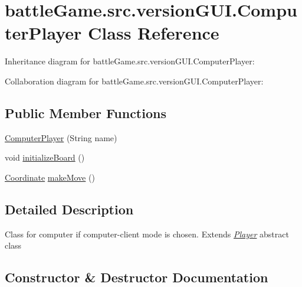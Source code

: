 \hypertarget{classbattleGame_1_1src_1_1versionGUI_1_1ComputerPlayer}{}\section{battle\+Game.\+src.\+version\+G\+U\+I.\+Computer\+Player Class Reference}
\label{classbattleGame_1_1src_1_1versionGUI_1_1ComputerPlayer}


Inheritance diagram for battle\+Game.\+src.\+version\+G\+U\+I.\+Computer\+Player\+:


Collaboration diagram for battle\+Game.\+src.\+version\+G\+U\+I.\+Computer\+Player\+:
\subsection*{Public Member Functions}
\begin{DoxyCompactItemize}
\item 
\hyperlink{classbattleGame_1_1src_1_1versionGUI_1_1ComputerPlayer_a9e3c1cdeba9113b3cf3dcb27ed9be0a4}{Computer\+Player} (String name)
\item 
void \hyperlink{classbattleGame_1_1src_1_1versionGUI_1_1ComputerPlayer_ae3521d354f8c0492b415c7b902d19e19}{initialize\+Board} ()
\item 
\hyperlink{classbattleGame_1_1src_1_1versionGUI_1_1Coordinate}{Coordinate} \hyperlink{classbattleGame_1_1src_1_1versionGUI_1_1ComputerPlayer_a7f5133e8159f65a2b5f9492197b7edab}{make\+Move} ()
\end{DoxyCompactItemize}


\subsection{Detailed Description}
Class for computer if computer-\/client mode is chosen. Extends {\itshape \hyperlink{classbattleGame_1_1src_1_1versionGUI_1_1Player}{Player}} abstract class 

\subsection{Constructor \& Destructor Documentation}
